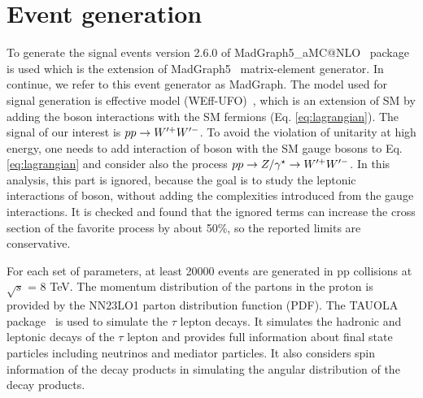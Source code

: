 \section{Event generation}\label{sec:simulation}
To generate the signal events version 2.6.0 of   MadGraph5\_aMC@NLO~\cite{Alwall:2014hca} package is used which is the extension of MadGraph5~\cite{Alwall:2011uj} matrix-element generator. In continue, we refer to this event generator  as MadGraph.
The model used for signal generation is \wprime effective model (WEff-UFO)~\cite{Sullivan:2002jt}, which  is an extension of SM by adding the \wprime boson interactions with the SM fermions (Eq. \ref{eq:lagrangian}). The signal of our interest is $ pp\rightarrow W^{\prime+} W^{\prime-}$. 
To avoid the violation of unitarity at high energy, one needs to add interaction of \wprime boson with the SM gauge bosons to Eq. \ref{eq:lagrangian} and consider also the process $pp\rightarrow Z/\gamma^{\star} \rightarrow W^{\prime+} W^{\prime-}$. In this analysis, this part is ignored, because the goal is to study the leptonic interactions of \wprime boson, without adding the complexities introduced from the gauge interactions. It is checked and found that the ignored terms can increase the cross section of the favorite process by about 50\%, so the reported limits are conservative.

For each set of parameters, at least 20000 events are generated in pp collisions at $\sqrt{s}$ = 8 TeV. 
The momentum distribution of the partons in the proton is provided by the NN23LO1 \cite{Ball:2013hta} parton distribution function (PDF). The TAUOLA package~\cite{Davidson:2010rw} is used to simulate the $\tau$ lepton decays. It simulates the hadronic and leptonic decays of the $\tau$ lepton and provides full information about final state particles including neutrinos and mediator particles. It also considers spin information of the decay products in simulating the angular distribution of the decay products.

